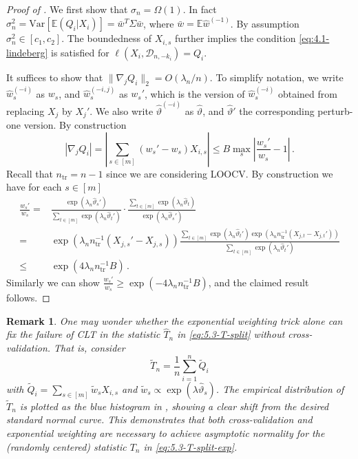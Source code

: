\documentclass[11pt]{article}
\theoremstyle{plain}
\newtheorem{remark}[theorem]{Remark}
\newcommand{\tr}{{\mathrm{tr}}}
\newcommand{\D}{{\mathcal{D}}}
\newcommand{\var}{\mathrm{Var}}
\begin{document}
\begin{proof}
    [Proof of ]
We first show that $\sigma_n=\Omega(1)$.
In fact $\sigma_n^2=\var[\mathbb E(Q_i|X_i)]=\bar w^T\Sigma\bar w$, where
$\bar w=\mathbb E \hat w^{(-1)}$. By assumption $\sigma_n^2\in[c_1,c_2]$.
The boundedness of $X_{i,s}$ further implies the condition \eqref{eq:4.1-lindeberg} is satisfied for $\ell(X_i,\D_{n,-k_i})=Q_i$.

It suffices to show that $\|\nabla_j Q_i\|_2=O(\lambda_n/n)$.
To simplify notation, we write $\hat w_s^{(-i)}$ as $w_s$, and $\hat w_s^{(-i,j)}$ as $w_s'$, which is the version of $\hat w_s^{(-i)}$ obtained from replacing $X_j$ by $X_j'$. We also write $\hat\vartheta^{(-i)}$ as $\hat\vartheta$, and $\hat\vartheta'$ the corresponding perturb-one version. By construction
$$
|\nabla_j Q_i| = \left|\sum_{s\in[m]}(w_s'-w_s)X_{i,s}\right|\le B \max_s \left|\frac{w_s'}{w_s}-1\right|\,.
$$
Recall that $n_\tr=n-1$ since we are considering LOOCV. By construction we have for each $s\in[m]$
\begin{align*}
\frac{w_s'}{w_s}=&\frac{\exp(\lambda_n\hat\vartheta_s')}{\sum_{t\in[m]}\exp(\lambda_n \hat\vartheta_t')}\cdot\frac{\sum_{t\in[m]}\exp(\lambda_n \hat\vartheta_t)}{\exp(\lambda_n\hat\vartheta_s')}\\
=&\exp(\lambda_n n_\tr^{-1}(X_{j,s}'-X_{j,s}))\frac{\sum_{t\in[m]}\exp(\lambda_n\hat\vartheta_t')\exp(\lambda_n n_\tr^{-1}(X_{j,t}-X_{j,t}'))}{\sum_{t\in[m]}\exp(\lambda_n\hat\vartheta_t')}\\
\le & \exp(4\lambda_n n_\tr^{-1}B)\,.
\end{align*}
Similarly we can show $\frac{w_s'}{w_s}\ge \exp(-4\lambda_n n_\tr^{-1}B)$, and the claimed result follows.
\end{proof}

\begin{remark}
    \label{rem:5.3-necessity-of-both}
    One may wonder whether the exponential weighting trick alone can fix the failure of CLT in the statistic $\hat T_n$ in \eqref{eq:5.3-T-split} without cross-validation. That is, consider $$\tilde T_n=\frac{1}{n}\sum_{i=1}^n\tilde Q_i$$
    with $\tilde Q_i=\sum_{s\in[m]}\tilde w_s X_{i,s}$
    and $\tilde w_s\propto \exp(\lambda \hat\vartheta_s)$.  The empirical distribution of $\tilde T_n$ is plotted as the blue histogram in , showing a clear shift from the desired standard normal curve.  This demonstrates that both cross-validation and exponential weighting are necessary to achieve asymptotic normality for the (randomly centered) statistic $T_n$ in \eqref{eq:5.3-T-split-exp}.
\end{remark}
\end{document}
